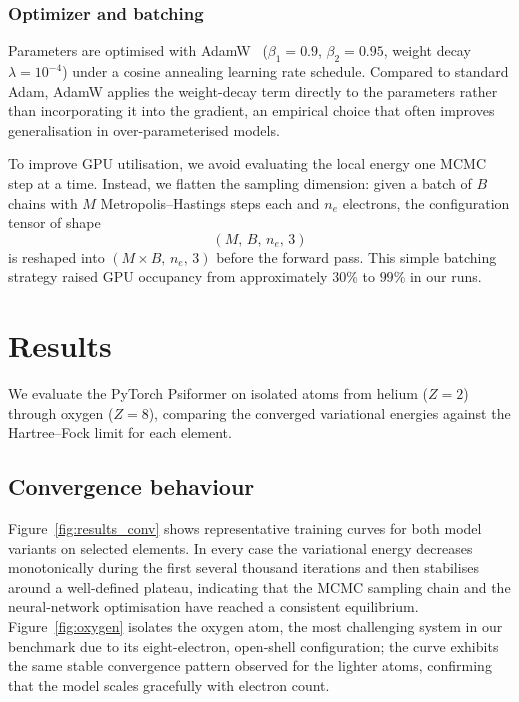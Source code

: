 \subsubsection{Optimizer and batching}

Parameters are optimised with AdamW~\cite{adamw} ($\beta_1=0.9$, $\beta_2=0.95$, weight decay $\lambda=10^{-4}$) under a cosine annealing learning rate schedule. Compared to standard Adam, AdamW applies the weight-decay term directly to the parameters rather than incorporating it into the gradient, an empirical choice that often improves generalisation in over-parameterised models.

To improve GPU utilisation, we avoid evaluating the local energy one MCMC step at a time. Instead, we flatten the sampling dimension: given a batch of $B$ chains with $M$ Metropolis--Hastings steps each and $n_e$ electrons, the configuration tensor of shape
\begin{equation}
	(M,\, B,\, n_e,\, 3)
	\label{eq:batching}
\end{equation}
is reshaped into $(M\times B,\, n_e,\, 3)$ before the forward pass. This simple batching strategy raised GPU occupancy from approximately $30\%$ to $99\%$ in our runs.

\section{Results}

We evaluate the PyTorch Psiformer on isolated atoms from helium ($Z=2$) through oxygen ($Z=8$), comparing the converged variational energies against the Hartree--Fock limit for each element.

\subsection{Convergence behaviour}

Figure~\ref{fig:results_conv} shows representative training curves for both model variants on selected elements. In every case the variational energy decreases monotonically during the first several thousand iterations and then stabilises around a well-defined plateau, indicating that the MCMC sampling chain and the neural-network optimisation have reached a consistent equilibrium. Figure~\ref{fig:oxygen} isolates the oxygen atom, the most challenging system in our benchmark due to its eight-electron, open-shell configuration; the curve exhibits the same stable convergence pattern observed for the lighter atoms, confirming that the model scales gracefully with electron count.

